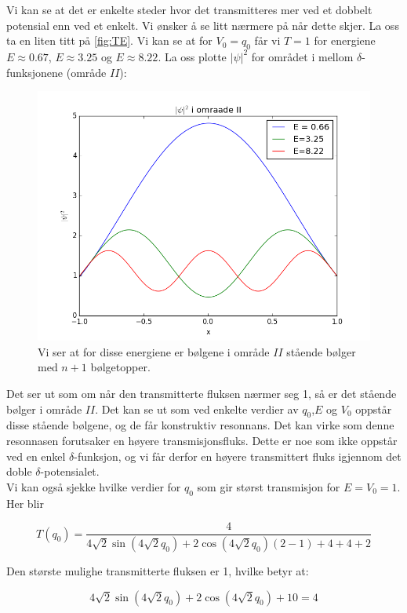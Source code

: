\documentclass[a4paper,norsk, 10pt]{article}
\numberwithin{equation}{section}
\begin{document}
Vi kan se at det er enkelte steder hvor det transmitteres mer ved et dobbelt potensial enn ved et enkelt. Vi ønsker å se litt nærmere på når dette skjer. La oss ta en liten titt på \ref{fig:TE}. Vi kan se at for $V_0 = q_0$ får vi $T = 1$ for energiene $E \approx 0.67$, $E \approx 3.25$ og $E \approx 8.22$. La oss plotte $|\psi|^2$ for området i mellom $\delta$-funksjonene (område $II$):

\begin{figure}[H]
\centering
\includegraphics[scale=0.5]{psi2omr2.png}
\caption{Vi ser at for disse energiene er bølgene i område $II$ stående bølger med $n+1$ bølgetopper.}
\end{figure}

Det ser ut som om når den transmitterte fluksen nærmer seg 1, så er det stående bølger i område $II$. Det kan se ut som ved enkelte verdier av $q_0$,$E$ og $V_0$ oppstår disse stående bølgene, og de får konstruktiv resonnans. Det kan virke som denne resonnasen forutsaker en høyere transmisjonsfluks. Dette er noe som ikke oppstår ved en enkel $\delta$-funksjon, og vi får derfor en høyere transmittert fluks igjennom det doble $\delta$-potensialet.\\


Vi kan også sjekke hvilke verdier for $q_0$ som gir størst transmisjon for $E = V_0 = 1$. Her blir

$$
T(q_0) = \frac{4}{4\sqrt{2}\sin(4\sqrt{2} q_0) + 2\cos(4\sqrt{2} q_0)(2 - 1)+4 +4 + 2}
$$

Den største mulighe transmitterte fluksen er 1, hvilke betyr at:

$$
4\sqrt{2}\sin(4\sqrt{2} q_0) + 2\cos(4\sqrt{2} q_0)+10 = 4
$$
\end{document}
